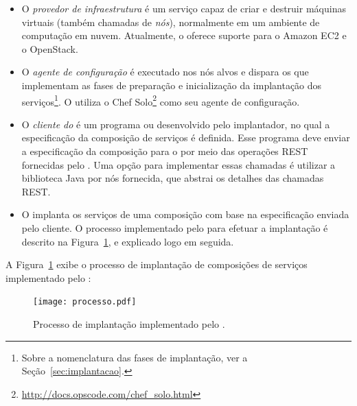 \begin{itemize}

\item O \emph{provedor de infraestrutura} é um serviço capaz de criar e destruir máquinas virtuais 
(também chamadas de \emph{nós}), normalmente em um ambiente de computação em nuvem. 
Atualmente, o \ee oferece suporte para o Amazon EC2 e o OpenStack.

\item O \emph{agente de configuração} é executado nos nós alvos
e dispara os \scripts que implementam as fases de preparação
e inicialização da implantação dos serviços\footnote{Sobre a nomenclatura das fases de implantação, ver a Seção~\ref{sec:implantacao}.}.
O \ee utiliza o Chef Solo\footnote{\url{http://docs.opscode.com/chef_solo.html}}
como seu agente de configuração.

\item O \emph{cliente do \ee} é um programa ou \script desenvolvido
pelo implantador, no qual a especificação da composição de serviços é definida.
Esse programa deve enviar a especificação da composição para o \ee
por meio das operações REST fornecidas pelo \ee.
Uma opção para implementar essas chamadas é utilizar
a biblioteca Java por nós fornecida, que abstrai os detalhes
das chamadas REST.

\item O \emph{\ee} implanta os serviços de uma composição
com base na especificação enviada pelo cliente.
O processo implementado pelo \ee para efetuar a implantação
é descrito na Figura~\ref{fig:processo}, e explicado logo em seguida. 

\end{itemize} 

A Figura~\ref{fig:processo} exibe o processo de implantação de composições
de serviços implementado pelo \ee:

\begin{figure}[ht]
\centering
\texttt{[image: processo.pdf]}
\caption{Processo de implantação implementado pelo \ee.}
\label{fig:processo}
\end{figure}

